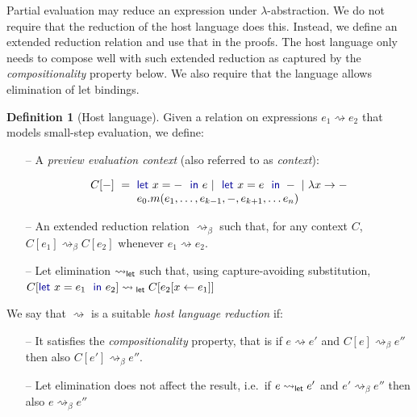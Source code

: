 \documentclass[sigplan,10pt]{acmart}\settopmatter{printfolios=true,printccs=false,printacmref=false}
\newcounter{dfc}
\theoremstyle{plain}
\theoremstyle{definition}
\newtheorem{definition}[dfc]{Definition}
\newcommand{\ident}[1]{\textnormal{\sffamily #1}}
\newcommand{\kvd}[1]{\textnormal{\textcolor{kvdclr}{\sffamily #1}}}
\begin{document}
Partial evaluation may reduce an expression under $\lambda$-abstraction. We do not require that
the reduction of the host language does this. Instead, we define an extended reduction relation
and use that in the proofs. The host language only needs to compose well with such extended reduction
as captured by the \emph{compositionality} property below. We also require that the language allows
elimination of let bindings.

\begin{definition}[Host language]
\label{def:host}
Given a relation on expressions $e_1 \rightsquigarrow e_2$ that models small-step evaluation, we define:

\begin{itemize}
\item[--]  
 A \emph{preview evaluation context} (also referred to as \emph{context}):

\vspace{-1.25em}
\begin{equation*}
\begin{array}{lcl}
C[-] &\hspace{-1em}=\hspace{-1em}& \kvd{let}~x = -~\kvd{in}~e ~|~ \kvd{let}~x = e~\kvd{in}~- ~|~ \lambda x\rightarrow - \\
     &&  e_0.m(e_1, \ldots, e_{k-1}, -, e_{k+1}, \ldots e_n)
\end{array}
\end{equation*}

\item[--]  
An extended reduction relation $\rightsquigarrow_\beta$ such that, for any context $C$, 
$C[e_1] \rightsquigarrow_\beta C[e_2]$ whenever $e_1 \rightsquigarrow e_2$.

\item[--]  
Let elimination $\rightsquigarrow_\ident{let}$ such that, using  capture-avoiding substitution,
  $C[\kvd{let}~x=e_1~\kvd{in}~e_2] \rightsquigarrow_\ident{let} C[e_2[x\leftarrow e_1]]$
\end{itemize}

\noindent
We say that $\rightsquigarrow$ is a suitable \emph{host language reduction} if:
\begin{itemize}
\item[--] It satisfies the \emph{compositionality} property, that is if $e \rightsquigarrow e'$ and 
$C[e]\rightsquigarrow_\beta e''$ then also $C[e']\rightsquigarrow_\beta e''$.

\item[--] Let elimination does not affect the result, i.e.~if $e \rightsquigarrow_{\ident{let}} e'$ 
and $e'\rightsquigarrow_\beta e''$ then also $e\rightsquigarrow_\beta e''$ 
\end{itemize}
\end{definition}
\end{document}
